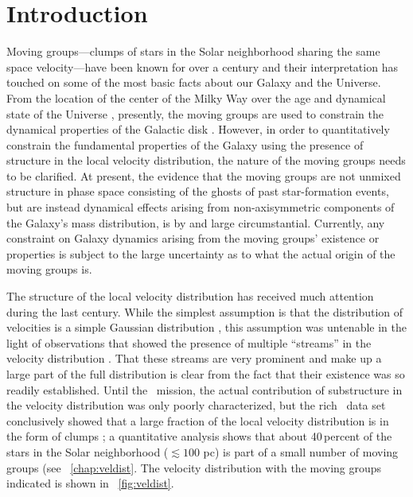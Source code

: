 \section{Introduction}\label{sec:intro}

Moving groups---clumps of stars in the Solar neighborhood sharing the
same space velocity---have been known for over a century
\citep{1846AN.....24..213M,proctor69a} and their interpretation has touched on
some of the most basic facts about our Galaxy and the Universe. From
the location of the center of the Milky Way \citep{madler47} over the
age and dynamical state of the Universe
\citep{Jeans15a,Jeans35a,Bok46a}, presently, the moving groups are
used to constrain the dynamical properties of the Galactic disk
\citep[\eg,][]{dehnen00a,Quillen05a}. However, in order to
quantitatively constrain the fundamental properties of the Galaxy
using the presence of structure in the local velocity distribution,
the nature of the moving groups needs to be clarified. At present, the
evidence that the moving groups are not unmixed structure in phase
space consisting of the ghosts of past star-formation events, but are
instead dynamical effects arising from non-axisymmetric components of
the Galaxy's mass distribution, is by and large
circumstantial. Currently, any constraint on Galaxy dynamics arising
from the moving groups' existence or properties is subject to the
large uncertainty as to what the actual origin of the moving groups
is.

The structure of the local velocity distribution has received much
attention during the last century. While the simplest assumption is
that the distribution of velocities is a simple Gaussian distribution
\citep{schwarzschild07a}, this assumption was untenable in the light
of observations that showed the presence of multiple ``streams'' in
the velocity distribution \citep{kapteyn05a,1910MNRAS..71...43E}. That
these streams are very prominent and make up a large part of the full
distribution is clear from the fact that their existence was so
readily established. Until the \Hipparcos\ mission, the actual
contribution of substructure in the velocity distribution was only
poorly characterized, but the rich \Hipparcos\ data set conclusively
showed that a large fraction of the local velocity distribution is in
the form of clumps \citep{1998AJ....115.2384D,1999MNRAS.308..731S}; a
quantitative analysis shows that about 40\,percent of the stars in the
Solar neighborhood ($\lesssim 100$ pc) is part of a small number of
moving groups (see \chaptername~\ref{chap:veldist}. The velocity
distribution with the moving groups indicated is shown
in \figurename~\ref{fig:veldist}.


